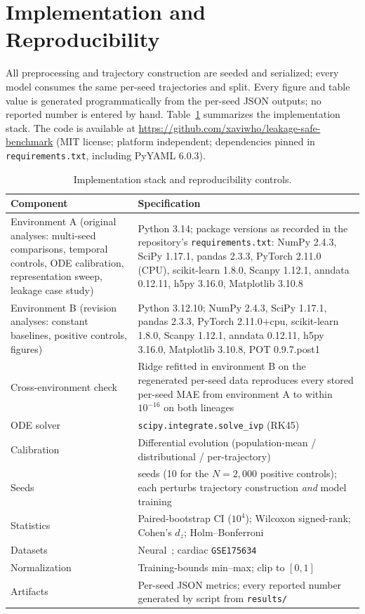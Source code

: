 \documentclass[10pt,journal,compsoc]{IEEEtran}
\begin{document}
\section{Implementation and Reproducibility}
\label{sup:impl}

All preprocessing and trajectory construction are seeded and serialized; every model consumes the same per-seed trajectories and split. Every figure and table value is generated programmatically from the per-seed JSON outputs; no reported number is entered by hand. Table~\ref{tab:impl_repro} summarizes the implementation stack. The code is available at \url{https://github.com/xaviwho/leakage-safe-benchmark} (MIT license; platform independent; dependencies pinned in \texttt{requirements.txt}, including PyYAML 6.0.3).

\begin{table}[!t]
\centering
\caption{Implementation stack and reproducibility controls.}
\label{tab:impl_repro}
\footnotesize
\setlength{\tabcolsep}{4pt}
\begin{tabular}{>{\raggedright\arraybackslash}p{} >{\raggedright\arraybackslash}p{}}
\toprule
\textbf{Component} & \textbf{Specification} \\
\midrule
Environment A (original analyses: multi-seed comparisons, temporal controls, ODE calibration, representation sweep, leakage case study) & Python 3.14; package versions as recorded in the repository's \texttt{requirements.txt}: NumPy 2.4.3, SciPy 1.17.1, pandas 2.3.3, PyTorch 2.11.0 (CPU), scikit-learn 1.8.0, Scanpy 1.12.1, anndata 0.12.11, h5py 3.16.0, Matplotlib 3.10.8 \\
Environment B (revision analyses: constant baselines, positive controls, figures) & Python 3.12.10; NumPy 2.4.3, SciPy 1.17.1, pandas 2.3.3, PyTorch 2.11.0+cpu, scikit-learn 1.8.0, Scanpy 1.12.1, anndata 0.12.11, h5py 3.16.0, Matplotlib 3.10.8, POT 0.9.7.post1 \\
Cross-environment check & Ridge refitted in environment B on the regenerated per-seed data reproduces every stored per-seed MAE from environment A to within $10^{-16}$ on both lineages \\
ODE solver & \texttt{scipy.integrate.solve\_ivp} (RK45) \\
Calibration & Differential evolution (population-mean / distributional / per-trajectory) \\
Seeds & 20 seeds (10 for the $N=2{,}000$ positive controls); each perturbs trajectory construction \emph{and} model training \\
Statistics & Paired-bootstrap CI ($10^4$); Wilcoxon signed-rank; Cohen's $d_z$; Holm--Bonferroni \\
Datasets & Neural~\cite{jerber2021population}; cardiac \texttt{GSE175634}~\cite{elorbany2022single} \\
Normalization & Training-bounds min--max; clip to $[0,1]$ \\
Artifacts & Per-seed JSON metrics; every reported number generated by script from \texttt{results/} \\
\bottomrule
\end{tabular}
\end{table}



\end{document}
